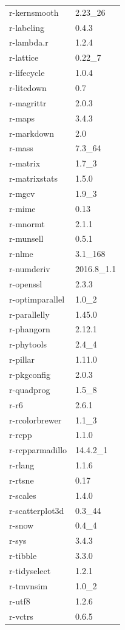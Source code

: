 \begin{longtable}{ll}
    r-kernsmooth&2.23\_26 \\
    r-labeling&0.4.3 \\
    r-lambda.r&1.2.4 \\
    r-lattice&0.22\_7 \\
    r-lifecycle&1.0.4 \\
    r-litedown&0.7 \\
    r-magrittr&2.0.3 \\
    r-maps&3.4.3 \\
    r-markdown&2.0 \\
    r-mass&7.3\_64 \\
    r-matrix&1.7\_3 \\
    r-matrixstats&1.5.0 \\
    r-mgcv&1.9\_3 \\
    r-mime&0.13 \\
    r-mnormt&2.1.1 \\
    r-munsell&0.5.1 \\
    r-nlme&3.1\_168 \\
    r-numderiv&2016.8\_1.1 \\
    r-openssl&2.3.3 \\
    r-optimparallel&1.0\_2 \\
    r-parallelly&1.45.0 \\
    r-phangorn&2.12.1 \\
    r-phytools&2.4\_4 \\
    r-pillar&1.11.0 \\
    r-pkgconfig&2.0.3 \\
    r-quadprog&1.5\_8 \\
    r-r6&2.6.1 \\
    r-rcolorbrewer&1.1\_3 \\
    r-rcpp&1.1.0 \\
    r-rcpparmadillo&14.4.2\_1 \\
    r-rlang&1.1.6 \\
    r-rtsne&0.17 \\
    r-scales&1.4.0 \\
    r-scatterplot3d&0.3\_44 \\
    r-snow&0.4\_4 \\
    r-sys&3.4.3 \\
    r-tibble&3.3.0 \\
    r-tidyselect&1.2.1 \\
    r-tmvnsim&1.0\_2 \\
    r-utf8&1.2.6 \\
    r-vctrs&0.6.5 \\

\end{longtable}
